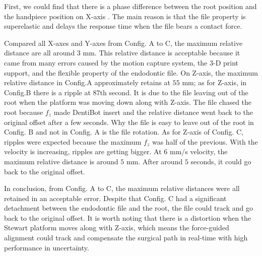 \par
First, we could find that there is a phase difference between the root position and the handpiece position on X-axis . The main reason is that the file property is superelastic and delays the response time when the file bears a contact force. 
\par
Compared all X-axes and Y-axes from Config. A to C, the maximum relative distance are all around $3$ mm. This relative distance is acceptable because it came from many errors caused by the motion capture system, the 3-D print support, and the flexible property of the endodontic file. On Z-axis, the maximum relative distance in Config.A approximately retains at $55$ mm; as for Z-axis, in Config.B there is a ripple at $87$th second. It is due to the file leaving out of the root when the platform was moving down along with Z-axis. The file chased the root because $f_z$ made DentiBot insert and the relative distance went back to the original offset after a few seconds. Why the file is easy to leave out of the root in Config. B and not in Config. A is the file rotation. As for Z-axis of Config. C, ripples were expected because the maximum $f_z$ was half of the previous. With the velocity is increasing, ripples are getting bigger. At $6$ mm/s velocity, the maximum relative distance is around $5$ mm. After around $5$ seconds, it could go back to the original offset.
\par
In conclusion, from Config. A to C, the maximum relative distances were all retained in an acceptable error. Despite that Config. C had a significant detachment between the endodontic file and the root, the file could track and go back to the original offset. It is worth noting that there is a distortion when the Stewart platform moves along with Z-axis, which means the force-guided alignment could track and compensate the surgical path in real-time with high performance in uncertainty.
\par
